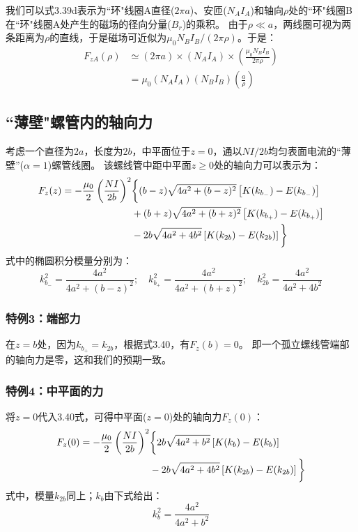 我们可以式3.39d表示为``环"线圈A直径($2\pi a$)、安匝($N_A I_A$)和轴向$\rho$处的``环"线圈B在``环"线圈A处产生的磁场的径向分量($B_r$)的乘积。
由于$\rho\ll a$，两线圈可视为两条距离为$\rho$的直线，于是磁场可近似为$\mu_0 N_B I_B/(2\pi\rho)$。于是：
\begin{align*}
F_{zA}(\rho)&\simeq (2\pi a)\times(N_A I_A)\times\left(\frac{\mu_0 N_B I_B}{2\pi\rho}\right)\\
&=\mu_0(N_A I_A)(N_B I_B)(\frac{a}{\rho}) \tag{3.39d}
\end{align*}


\subsection{``薄壁"螺管内的轴向力}
考虑一个直径为$2a$，长度为$2b$，中平面位于$z=0$，通以$NI/2b$均匀表面电流的``薄壁''($\alpha=1$)螺管线圈。
该螺线管中距中平面$z\ge 0$处的轴向力可以表示为：
\begin{align}
F_z(z)=-\frac{\mu_0}{2}\left(\frac{NI}{2b}\right)^2&\bigg\{(b-z)\sqrt{4a^2+(b-z)^2}\left[K(k_{b_-})-E(k_{b_-})\right]\\\notag
&+(b+z)\sqrt{4a^2+(b+z)^2}\left[K(k_{b_+})-E(k_{b_+})\right]\\\notag
&-2b\sqrt{4a^2+4b^2}\left[K(k_{2b})-E(k_{2b})\right]\bigg\}
\end{align}
式中的椭圆积分模量分别为：
$$k_{b_-}^2=\frac{4a^2}{4a^2+(b-z)^2} ; \quad k_{b_+}^2=\frac{4a^2}{4a^2+(b+z)^2} ;\quad k_{2b}^2=\frac{4a^2}{4a^2+4 b^2}$$

\subsubsection{特例3：端部力}
在$z=b$处，因为$k_{b_+}=k_{2b}$，根据式3.40，有$F_z(b)=0$。
即一个孤立螺线管端部的轴向力是零，这和我们的预期一致。

\subsubsection{特例4：中平面的力}
将$z=0$代入3.40式，可得中平面($z=0$)处的轴向力$F_z(0)$：
\begin{align}
  F_z(0)=-\frac{\mu_0}{2}\left(\frac{NI}{2b}\right)^2&\bigg\{2b\sqrt{4a^2+b^2}\left[K(k_{b})-E(k_{b})\right]\\\notag
  &-2b\sqrt{4a^2+4b^2}\left[K(k_{2b})-E(k_{2b})\right]\bigg\}
\end{align}
式中，模量$k_{2b}$同上；$k_{b}$由下式给出：
$$k_{b}^2=\frac{4a^2}{4a^2+b^2}$$

